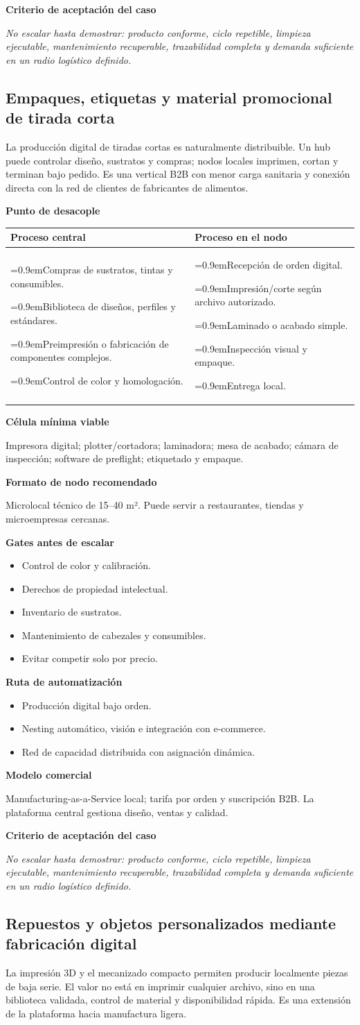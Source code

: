 \documentclass[11pt,a4paper]{article}
\makeatletter
\newcommand{\etiqueta}[1]{\par\medskip\noindent\textbf{#1}\par\nopagebreak\smallskip}
\newcommand{\ti}{\par\hangindent=0.9em\hangafter=1\noindent\makebox[0.9em][l]{\textbullet}}
\newcommand{\desacople}[2]{\etiqueta{Punto de desacople}
  {\small\noindent\begin{tabularx}{\textwidth}{@{}>{\raggedright\arraybackslash}X>{\raggedright\arraybackslash}X@{}}
  \toprule \textbf{Proceso central} & \textbf{Proceso en el nodo}\\ \midrule
  #1 & #2\\ \bottomrule\end{tabularx}}\par}
\newcommand{\rutas}[3]{\etiqueta{Ruta de automatización}
  \begin{itemize}[leftmargin=2.6em,labelwidth=2em]
  \item[\textbf{1.0}] #1
  \item[\textbf{2.0}] #2
  \item[\textbf{3.0}] #3
  \end{itemize}}
\newcommand{\criterio}{\etiqueta{Criterio de aceptación del caso}
  \noindent\textit{No escalar hasta demostrar: producto conforme, ciclo repetible, limpieza ejecutable,
  mantenimiento recuperable, trazabilidad completa y demanda suficiente en un radio logístico definido.}\par}
\makeatother
\begin{document}
\criterio

\subsection{Empaques, etiquetas y material promocional de tirada corta}
La producción digital de tiradas cortas es naturalmente distribuible. Un hub puede controlar diseño,
sustratos y compras; nodos locales imprimen, cortan y terminan bajo pedido. Es una vertical B2B con menor
carga sanitaria y conexión directa con la red de clientes de fabricantes de alimentos.

\desacople{%
\ti Compras de sustratos, tintas y consumibles.
\ti Biblioteca de diseños, perfiles y estándares.
\ti Preimpresión o fabricación de componentes complejos.
\ti Control de color y homologación.}{%
\ti Recepción de orden digital.
\ti Impresión/corte según archivo autorizado.
\ti Laminado o acabado simple.
\ti Inspección visual y empaque.
\ti Entrega local.}

\etiqueta{Célula mínima viable}
Impresora digital; plotter/cortadora; laminadora; mesa de acabado; cámara de inspección; software de
preflight; etiquetado y empaque.

\etiqueta{Formato de nodo recomendado}
Microlocal técnico de 15--40 m². Puede servir a restaurantes, tiendas y microempresas cercanas.

\etiqueta{Gates antes de escalar}
\begin{itemize}
\item Control de color y calibración.
\item Derechos de propiedad intelectual.
\item Inventario de sustratos.
\item Mantenimiento de cabezales y consumibles.
\item Evitar competir solo por precio.
\end{itemize}

\rutas{Producción digital bajo orden.}
{Nesting automático, visión e integración con e-commerce.}
{Red de capacidad distribuida con asignación dinámica.}

\etiqueta{Modelo comercial}
Manufacturing-as-a-Service local; tarifa por orden y suscripción B2B. La plataforma central gestiona
diseño, ventas y calidad.

\criterio

\subsection{Repuestos y objetos personalizados mediante fabricación digital}
La impresión 3D y el mecanizado compacto permiten producir localmente piezas de baja serie. El valor no
está en imprimir cualquier archivo, sino en una biblioteca validada, control de material y disponibilidad
rápida. Es una extensión de la plataforma hacia manufactura ligera.
\end{document}
